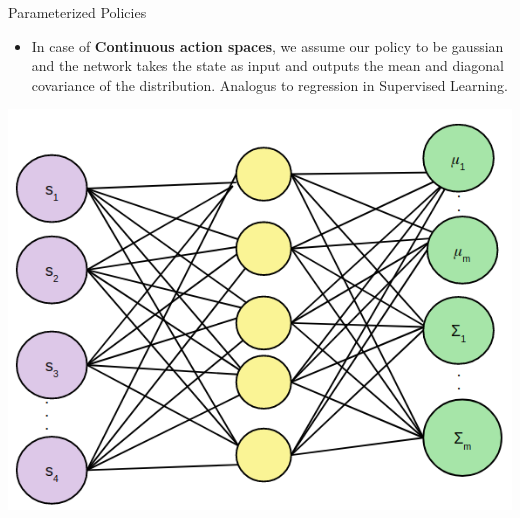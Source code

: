 \begin{frame}{Parameterized Policies}
\begin{itemize}
    \item In case of \textbf{Continuous action spaces}, we assume our policy to be gaussian and the network takes the state as input and outputs the mean and diagonal covariance of the distribution. Analogus to regression in Supervised Learning.
\end{itemize}
\begin{center}
    \includegraphics[scale=0.3]{img/contaction.png}

\end{center}
\end{frame}
